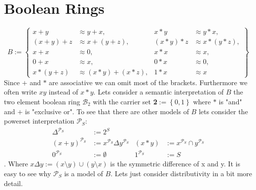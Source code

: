 \section{Boolean Rings}
\[B:=\left\lbrace 
\begin{aligned}
x+y&\approx y+x,& x*y&\approx y*x,\\
(x+y)+z&\approx x+(y+z),& (x*y)*z&\approx x*(y*z),\\
x+x&\approx 0,& x*x&\approx x,\\
0+x&\approx x,& 0*x&\approx 0,\\
x*(y+z)&\approx (x*y)+(x*z),& 1*x&\approx x
\end{aligned}
\right\rbrace \]
Since $+$ and $*$ are associative we can omit most of the brackets. Furthermore we often write $xy$ instead of $x*y$.
Lets consider a semantic interpretation of $B$ the two element boolean ring $\mathcal{B}_2$ with the carrier set \textbf{2}$:=\left\lbrace 0,1\right\rbrace$ where $*$ is "and" and $+$ is "exclusive or". 
To see that there are other models of $B$ lets consider the powerset interpretation $\mathcal{P}_S$:
\begin{align*}
\Delta^{\mathcal{P}_S}&:=2^S\\
(x+y)^{\mathcal{P}_S}&:=x^{\mathcal{P}_S}\Delta y^{\mathcal{P}_S}& (x*y)&:=x^{\mathcal{P}_S}\cap y^{\mathcal{P}_S}\\
0^{\mathcal{P}_S}&:=\emptyset& 1^{\mathcal{P}_S}&:=S
\end{align*}.
Where $x\Delta y:=(x\setminus y)\cup(y\setminus x)$ is the symmetric difference of x and y. It is easy to see why $\mathcal{P}_S$ is a model of $B$. Lets just consider distributivity in a bit more detail.
\begin{center}
\def\CircleX{(0.5,0.866) circle (0.8)}
\def\CircleY{(0,0) circle (0.8)}
\def\CircleZ{(1,0) circle (0.8)}
\end{center}